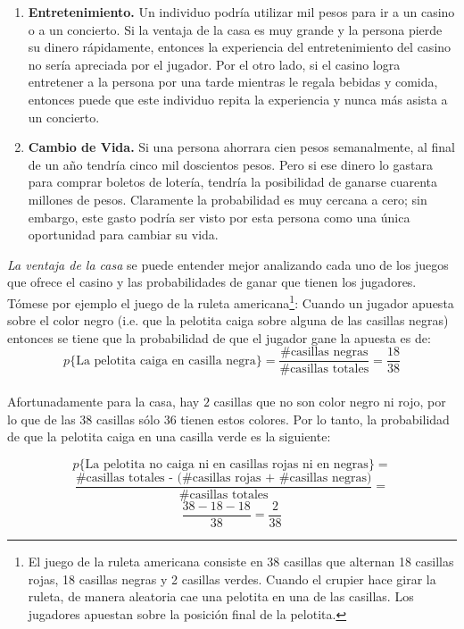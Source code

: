 \begin{enumerate}
	\item \textbf{Entretenimiento.} Un individuo podría utilizar mil pesos para ir a un casino o a un concierto. Si la ventaja de la casa es muy grande y la persona pierde su dinero rápidamente, entonces la experiencia del entretenimiento del casino no sería apreciada por el jugador. Por el otro lado, si el casino logra entretener a la persona por una tarde mientras le regala bebidas y comida, entonces puede que este individuo repita la experiencia y nunca más asista a un concierto.
	\item \textbf{Cambio de Vida.} Si una persona ahorrara cien pesos semanalmente, al final de un año tendría cinco mil doscientos pesos. Pero si ese dinero lo gastara para comprar boletos de lotería, tendría la posibilidad de ganarse cuarenta millones de pesos. Claramente la probabilidad es muy cercana a cero; sin embargo, este gasto podría ser visto por esta persona como una única oportunidad para cambiar su vida.

\end{enumerate}

\emph{La ventaja de la casa} se puede entender mejor analizando cada uno de los juegos que ofrece el casino y las probabilidades de ganar que tienen los jugadores. Tómese por ejemplo el juego de la ruleta americana\footnote{El juego de la ruleta americana consiste en 38 casillas que alternan 18 casillas rojas, 18 casillas negras y 2 casillas verdes. Cuando el crupier hace girar la ruleta, de manera aleatoria cae una pelotita en una de las casillas. Los jugadores apuestan sobre la posición final de la pelotita.}:
Cuando un jugador apuesta sobre el color negro (i.e. que la pelotita caiga sobre alguna de las casillas negras) entonces se tiene que la probabilidad de que el jugador gane la apuesta es de:\\
\[p\{\text{La pelotita caiga en casilla negra}\} = \frac{\text{\# casillas negras}}{ \text{\# casillas totales}}  = \frac{18}{38}\]\\

Afortunadamente para la casa, hay $2$ casillas que no son color negro ni rojo, por lo que de las $38$ casillas sólo $36$  tienen estos colores. Por lo tanto, la probabilidad de que la pelotita caiga en una casilla verde es la siguiente:

\[p\{\text{La pelotita no caiga ni en casillas rojas ni en negras}\} =\] 
\[\frac{\text{\# casillas totales - (\# casillas rojas + \# casillas negras)}}{ \text{\# casillas totales}}  =\]
\[\frac{38-18-18}{38} = \frac{2}{38}  \]

